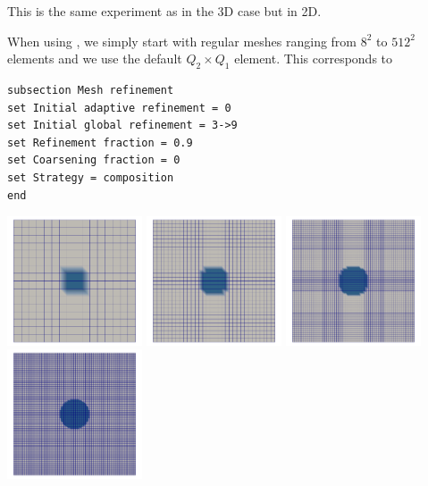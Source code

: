
This is the same experiment as in the 3D case but in 2D. 

When using \aspect, we simply start with regular meshes ranging from $8^2$ to $512^2$ elements 
and we use the default $Q_2\times Q_1$ element.  
This corresponds to 
\begin{verbatim}
subsection Mesh refinement
set Initial adaptive refinement = 0 
set Initial global refinement = 3->9 
set Refinement fraction = 0.9 
set Coarsening fraction = 0 
set Strategy = composition
end
\end{verbatim}

\begin{center}
\includegraphics[width=4cm]{images/stokes_sphere2D/aspect_FS_gr/C1_gr3}
\includegraphics[width=4cm]{images/stokes_sphere2D/aspect_FS_gr/C1_gr4}
\includegraphics[width=4cm]{images/stokes_sphere2D/aspect_FS_gr/C1_gr5}
\includegraphics[width=4cm]{images/stokes_sphere2D/aspect_FS_gr/C1_gr6}
\end{center}


